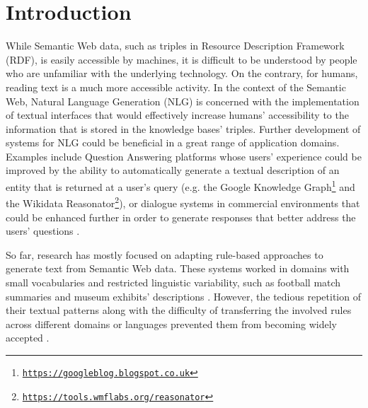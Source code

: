 \documentclass[preprint,5p]{elsarticle}
\begin{document}



\section{Introduction}
While Semantic Web data, such as triples in Resource Description Framework (RDF), is easily accessible by machines, it is difficult to be understood by people who are unfamiliar with the underlying technology. On the contrary, for humans, reading text is a much more accessible activity. In the context of the Semantic Web, Natural Language Generation (NLG) is concerned with the implementation of textual interfaces that would effectively increase humans' accessibility to the information that is stored in the knowledge bases' triples. Further development of systems for NLG could be beneficial in a great range of application domains. Examples include Question Answering platforms whose users' experience could be improved by the ability to automatically generate a textual description of an entity that is returned at a user's query (e.g. the Google Knowledge Graph\footnote{\href{https://googleblog.blogspot.co.uk/2012/05/introducing-knowledge-graph-things-not.html}{\texttt{https://googleblog.blogspot.co.uk}}} and the Wikidata Reasonator\footnote{\href{https://tools.wmflabs.org/reasonator}{\texttt{https://tools.wmflabs.org/reasonator}}}), or dialogue systems in commercial environments that could be enhanced further in order to generate responses that better address the users' questions \cite{Janzen2009}.


So far, research has mostly focused on adapting rule-based approaches to generate text from Semantic Web data. These systems worked in domains with small vocabularies and restricted linguistic variability, such as football match summaries \cite{Bouayad-Agha2012} and museum exhibits' descriptions \cite{Dannells2012}. However, the tedious repetition of their textual patterns along with the difficulty of transferring the involved rules across different domains or languages prevented them from becoming widely accepted \cite{Bouayad-Agha2014}.
\end{document}
